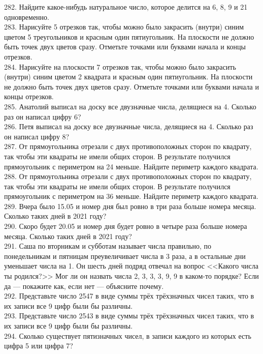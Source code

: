 282. Найдите какое-нибудь натуральное число, которое делится на 6, 8, 9 и 21 одновременно.\\
283. Нарисуйте 5 отрезков так, чтобы можно было закрасить (внутри) синим цветом 5 треугольников и красным один пятиугольник. На плоскости не должно быть точек двух цветов сразу. Отметьте точками или буквами начала и концы отрезков.\\
284. Нарисуйте на плоскости 7 отрезков так, чтобы можно было закрасить (внутри) синим цветом 2 квадрата и красным один пятиугольник. На плоскости не должно быть точек двух цветов сразу. Отметьте точками или буквами начала и концы отрезков.\\
285. Анатолий выписал на доску все двузначные числа, делящиеся на 4. Сколько раз он написал цифру 6?\\
286. Петя выписал на доску все двузначные числа, делящиеся на 4. Сколько раз он написал цифру 8?\\
287. От прямоугольника отрезали с двух противоположных сторон по квадрату, так чтобы эти квадраты не имели общих сторон. В результате получился прямоугольник с периметром на 24 меньше. Найдите периметр каждого квадрата.\\
288. От прямоугольника отрезали с двух противоположных сторон по квадрату, так чтобы эти квадраты не имели общих сторон. В результате получился прямоугольник с периметром на 36 меньше. Найдите периметр каждого квадрата.\\
289. Вчера было 15.05 и номер дня был ровно в три раза больше номера месяца. Сколько таких дней в 2021 году?\\
290. Скоро будет 20.05 и номер дня будет ровно в четыре раза больше номера месяца. Сколько таких дней в 2021 году?\\
291. Саша по вторникам и субботам называет числа правильно, по понедельникам и пятницам преувеличивает числа в 3 раза, а в остальные дни уменьшает числа на 1. Он шесть дней подряд отвечал на вопрос <<Какого числа ты родился?>> Мог ли он назвать числа 2, 3, 3, 3, 9, 9 в каком-то порядке? Если да --- покажите как, если нет --- объясните почему.\\
292. Представьте число 2547 в виде суммы трёх трёхзначных чисел таких, что в их записи все 9 цифр были бы различны.\\
293. Представьте число 2543 в виде суммы трёх трёхзначных чисел таких, что в их записи все 9 цифр были бы различны.\\
294. Сколько существует пятизначных чисел, в записи каждого из которых есть цифра 5 или цифра 7?\\

